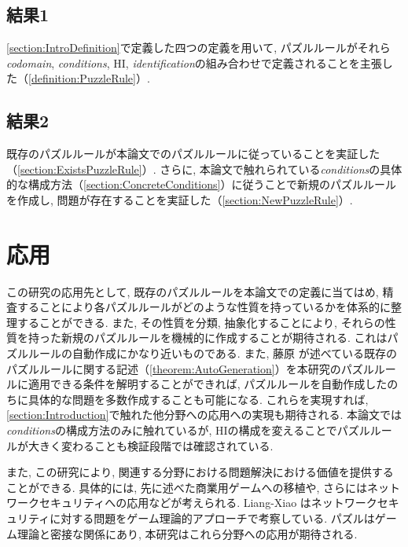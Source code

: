 \subsection*{結果1}
\cref{section:IntroDefinition}で定義した四つの定義を用いて, パズルルールがそれら\textit{codomain}, \textit{conditions}, HI, \textit{identification}の組み合わせで定義されることを主張した（\cref{definition:PuzzleRule}）.

\subsection*{結果2}
既存のパズルルールが本論文でのパズルルールに従っていることを実証した（\cref{section:ExistsPuzzleRule}）.
さらに, 本論文で触れられている\textit{conditions}の具体的な構成方法（\cref{section:ConcreteConditions}）に従うことで新規のパズルルールを作成し, 問題が存在することを実証した（\cref{section:NewPuzzleRule}）.

\section{応用}
この研究の応用先として, 既存のパズルルールを本論文での定義に当てはめ, 精査することにより各パズルルールがどのような性質を持っているかを体系的に整理することができる. また, その性質を分類, 抽象化することにより, それらの性質を持った新規のパズルルールを機械的に作成することが期待される. これはパズルルールの自動作成にかなり近いものである. また, 藤原 \cite{Fujiwara2022}が述べている既存のパズルルールに関する記述（\cref{theorem:AutoGeneration}）を本研究のパズルルールに適用できる条件を解明することができれば, パズルルールを自動作成したのちに具体的な問題を多数作成することも可能になる. これらを実現すれば, \cref{section:Introduction}で触れた他分野への応用への実現も期待される.
本論文では\textit{conditions}の構成方法のみに触れているが, HIの構成を変えることでパズルルールが大きく変わることも検証段階では確認されている.

また, この研究により, 関連する分野における問題解決における価値を提供することができる. 具体的には, 先に述べた商業用ゲームへの移植や, さらにはネットワークセキュリティへの応用などが考えられる. Liang-Xiao \cite{Liang2013}はネットワークセキュリティに対する問題をゲーム理論的アプローチで考察している. パズルはゲーム理論と密接な関係にあり, 	本研究はこれら分野への応用が期待される.